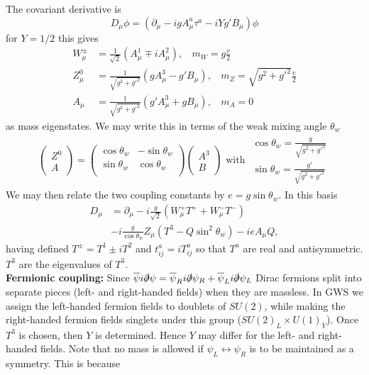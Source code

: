 \documentclass[a4paper, norsk, 8pt, landscape]{article}
\newcommand{\EQU}[1] { \begin{equation*} \begin{split}
#1
\end{split} \end{equation*} }
\begin{document}
\begin{multicols*}{3}
The covariant derivative is
\[
D_\mu \phi = \left( \partial_\mu - igA_\mu^a\tau^a - iYg'B_\mu \right) \phi
\]
for $Y=1/2$ this gives
\begin{align*}
W_{\mu}^{\pm}&= \frac{1}{\sqrt{2}}(A_{\mu}^1 \mp iA_{\mu}^2),     \ \ \ \ m_W = g \frac{v}{2}\\
Z_{\mu}^0 &= \frac{1}{\sqrt{g^2 + g'^2}}(gA_{\mu}^3 -g'B_{\mu}),  \ \ \ \ m_Z= \sqrt{g^2+g'^2}\frac{v}{2}\\
A_{\mu} &= \frac{1}{\sqrt{g^2+g'^2}}(g'A_{\mu}^3+gB_{\mu}),       \ \ \ \ m_A=0
\end{align*}
as mass eigenstates. We may write this in terms of the weak mixing angle $\theta_w$
\EQU{
\left(\begin{matrix}
Z^0 \\ A
\end{matrix}\right)
=
\left(\begin{matrix}
  \cos \theta_w   & -\sin \theta_w \\
  \sin \theta_w   &  \cos \theta_w \\
\end{matrix}\right)
\left(\begin{matrix}
A^3 \\ B
\end{matrix}\right)
\text{ with }
\begin{matrix}
\cos \theta_w = \frac{g}{\sqrt{g^2 +g'^2}}
\\
\sin \theta_w = \frac{g'}{\sqrt{g^2 +g'^2}}
\end{matrix}
}
We may then relate the two coupling constants by $e = g \sin \theta_w$. In this basis
\EQU{
D_\mu &= \partial_\mu
- i \frac{g}{\sqrt{2}}\left(W_\mu^+T^++W_\mu^-T^-\right)\\
&- i \frac{g}{\cos \theta_w } Z_\mu (T^3-Q \sin^2 \theta_w)
- ie A_\mu Q,
}
having defined $T^\pm = T^1 \pm i T^2$ and $t^a_{ij}=iT^a_{ij}$ so that $T^a$ are real and antisymmetric.
$T^3$ are the eigenvalues of $T^3$.
\\
\textbf{Fermionic coupling: }
Since $\overline{\psi}i\slashed{\partial}\psi = \overline{\psi}_R i\slashed{\partial}\psi_R + \overline{\psi}_L i\slashed{\partial}\psi_L$
Dirac fermions split into separate pieces (left- and right-handed fields) when they are massless. In GWS we assign
the left-handed fermion fields to doublets of $SU(2)$, while making the right-handed fermion fields singlets under
this group ($SU(2)_L \times U(1)_Y$). Once $T^3$ is chosen, then $Y$ is determined. Hence $Y$ may differ for the left- and right-handed fields.
Note that no mass is allowed if $\psi_L \leftrightarrow \psi_R$ is to be maintained as a symmetry. This is because

\end{multicols*}
\end{document}
